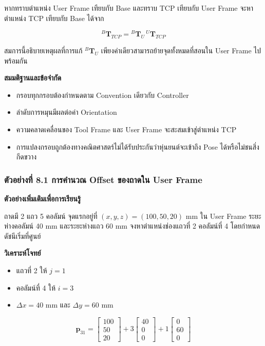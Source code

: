 หากทราบตำแหน่ง User Frame เทียบกับ Base และทราบ TCP เทียบกับ User Frame จะหาตำแหน่ง TCP เทียบกับ Base ได้จาก

\[
{}^{B}\mathbf{T}_{TCP} = {}^{B}\mathbf{T}_{U}\,{}^{U}\mathbf{T}_{TCP}
\]

สมการนี้อธิบายเหตุผลที่การแก้ ${}^{B}\mathbf{T}_{U}$ เพียงค่าเดียวสามารถย้ายจุดทั้งหมดที่สอนใน User Frame ไปพร้อมกัน

\textbf{สมมติฐานและข้อจำกัด}

\begin{itemize}
    \item กรอบทุกกรอบต้องกำหนดตาม Convention เดียวกับ Controller
    \item ลำดับการหมุนมีผลต่อค่า Orientation
    \item ความคลาดเคลื่อนของ Tool Frame และ User Frame จะสะสมเข้าสู่ตำแหน่ง TCP
    \item การแปลงกรอบถูกต้องทางคณิตศาสตร์ไม่ได้รับประกันว่าหุ่นยนต์จะเข้าถึง Pose ได้หรือไม่ชนสิ่งกีดขวาง
\end{itemize}

\subsubsection{ตัวอย่างที่ 8.1 การคำนวณ Offset ของถาดใน User Frame}

\textbf{ตัวอย่างเพิ่มเติมเพื่อการเรียนรู้}

ถาดมี 2 แถว 5 คอลัมน์ จุดแรกอยู่ที่ $(x,y,z)=(100,50,20)$ mm ใน User Frame ระยะห่างคอลัมน์ 40 mm และระยะห่างแถว 60 mm จงหาตำแหน่งช่องแถวที่ 2 คอลัมน์ที่ 4 โดยกำหนดดัชนีเริ่มที่ศูนย์

\textbf{วิเคราะห์โจทย์}

\begin{itemize}
    \item แถวที่ 2 ให้ $j=1$
    \item คอลัมน์ที่ 4 ให้ $i=3$
    \item $\Delta x=40$ mm และ $\Delta y=60$ mm
\end{itemize}

\[
\mathbf{p}_{31}=
\begin{bmatrix}100\\50\\20\end{bmatrix}
+3\begin{bmatrix}40\\0\\0\end{bmatrix}
+1\begin{bmatrix}0\\60\\0\end{bmatrix}
\]

